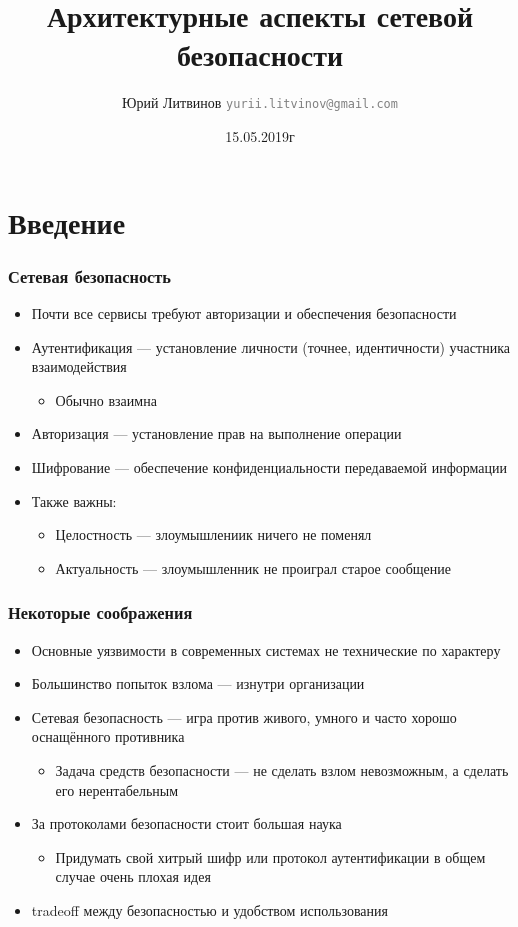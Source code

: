 \documentclass[xetex,mathserif,serif]{beamer}
\title{Архитектурные аспекты сетевой безопасности}
\author[Юрий Литвинов]{Юрий Литвинов \newline \textcolor{gray}{\small\texttt{yurii.litvinov@gmail.com}}}
\date{15.05.2019г}
\begin{document}
	\frame{\titlepage}

	\section{Введение}

	\begin{frame}
		\frametitle{Сетевая безопасность}
		\begin{itemize}
			\item Почти все сервисы требуют авторизации и обеспечения безопасности
			\item Аутентификация --- установление личности (точнее, идентичности) участника взаимодействия
			\begin{itemize}
				\item Обычно взаимна
			\end{itemize}
			\item Авторизация --- установление прав на выполнение операции
			\item Шифрование --- обеспечение конфиденциальности передаваемой информации
			\item Также важны:
			\begin{itemize}
				\item Целостность --- злоумышлениик ничего не поменял
				\item Актуальность --- злоумышленник не проиграл старое сообщение
			\end{itemize} 
		\end{itemize}
	\end{frame}

	\begin{frame}
		\frametitle{Некоторые соображения}
		\begin{itemize}
			\item Основные уязвимости в современных системах не технические по характеру
			\item Большинство попыток взлома --- изнутри организации
			\item Сетевая безопасность --- игра против живого, умного и часто хорошо оснащённого противника
			\begin{itemize}
				\item Задача средств безопасности --- не сделать взлом невозможным, а сделать его нерентабельным
			\end{itemize}
			\item За протоколами безопасности стоит большая наука
			\begin{itemize}
				\item Придумать свой хитрый шифр или протокол аутентификации в общем случае очень плохая идея
			\end{itemize} 
			\item tradeoff между безопасностью и удобством использования
		\end{itemize}
	\end{frame}
\end{document}
